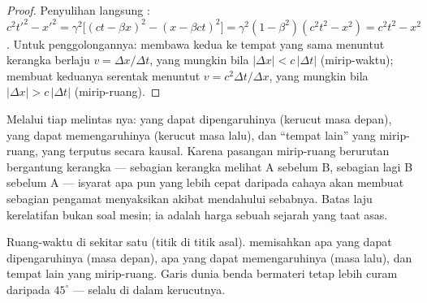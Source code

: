 \begin{proof}
Penyulihan langsung :
$c^2t'^2 - x'^2 = \gamma^2\big[(ct - \beta x)^2 - (x - \beta ct)^2
\big] = \gamma^2(1 - \beta^2)(c^2t^2 - x^2) = c^2t^2 - x^2$.
Untuk penggolongannya: membawa kedua  ke tempat yang sama
menuntut kerangka berlaju $v = \Delta x/\Delta t$, yang mungkin bila
$|\Delta x| <
c\,|\Delta t|$ (mirip-waktu); membuat keduanya serentak menuntut $v =
c^2\Delta t/\Delta x$, yang mungkin bila $|\Delta x| > c\,|\Delta t|$
(mirip-ruang).
\end{proof}

\begin{remark}\label{rem:b3:relativistic-kinematics:causality}
Melalui tiap  melintas \emph{}nya:  yang
dapat dipengaruhinya (kerucut masa depan),  yang dapat
memengaruhinya (kerucut masa lalu), dan ``tempat lain'' yang mirip-ruang,
yang terputus secara kausal. Karena pasangan mirip-ruang berurutan
bergantung kerangka --- sebagian kerangka melihat A sebelum B, sebagian
lagi B sebelum A --- isyarat apa pun yang lebih cepat daripada cahaya
akan membuat sebagian pengamat menyaksikan akibat mendahului sebabnya.
Batas laju kerelatifan bukan soal mesin; ia adalah harga sebuah sejarah
yang taat asas.
\end{remark}

\begin{omfigure}

{\small Ruang-waktu di sekitar satu  (titik di titik asal).
 memisahkan apa yang dapat dipengaruhinya (masa
depan), apa yang dapat memengaruhinya (masa lalu), dan tempat lain yang
mirip-ruang. Garis dunia benda bermateri tetap lebih curam daripada
$45^\circ$ --- selalu di dalam kerucutnya.}
\end{omfigure}


